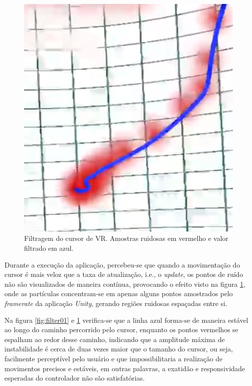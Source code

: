 \documentclass[conference]{IEEEtran}
\begin{document}
\begin{figure}[h!]
\centering
\includegraphics[width=\linewidth]{images/image_02.png}
\caption{Filtragem do cursor de VR. Amostras ruidosas em vermelho e valor filtrado em azul.}
\label{fig:filter02}
\end{figure}

Durante a execução da aplicação, percebeu-se que quando a movimentação do cursor é mais veloz que a taxa de atualização, i.e., o \textit{update}, os pontos de ruído não são visualizados de maneira contínua, provocando o efeito visto na figura \ref{fig:filter02}, onde as partículas concentram-se em apenas alguns pontos amostrados pelo \textit{framerate} da aplicação \textit{Unity}, gerando regiões ruidosas espaçadas entre si.

Na figura \ref{fig:filter01} e \ref{fig:filter02} verifica-se que a linha azul forma-se de maneira estável ao longo do caminho percorrido pelo cursor, enquanto os pontos vermelhos se espalham ao redor desse caminho, indicando que a amplitude máxima de instabilidade é cerca de duas vezes maior que o tamanho do cursor, ou seja, facilmente perceptível pelo usuário e que impossibilitaria a realização de movimentos precisos e estáveis, em outras palavras, a exatidão e responsividade esperadas do controlador não são satisfatórias.
\end{document}
